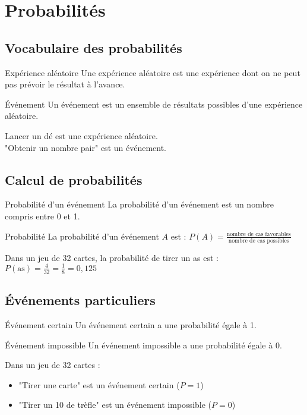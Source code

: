 \chapter{Probabilités}

\section{Vocabulaire des probabilités}
\begin{definition}{Expérience aléatoire}
Une expérience aléatoire est une expérience dont on ne peut pas prévoir le résultat à l'avance.
\end{definition}

\begin{definition}{Événement}
Un événement est un ensemble de résultats possibles d'une expérience aléatoire.
\end{definition}

\begin{exemple}
Lancer un dé est une expérience aléatoire.\\
"Obtenir un nombre pair" est un événement.
\end{exemple}

\section{Calcul de probabilités}
\begin{propriete}{Probabilité d'un événement}
La probabilité d'un événement est un nombre compris entre 0 et 1.
\end{propriete}

\begin{definition}{Probabilité}
La probabilité d'un événement $A$ est :
$P(A) = \frac{\text{nombre de cas favorables}}{\text{nombre de cas possibles}}$
\end{definition}

\begin{exemple}
Dans un jeu de 32 cartes, la probabilité de tirer un as est :
$P(\text{as}) = \frac{4}{32} = \frac{1}{8} = 0,125$
\end{exemple}

\section{Événements particuliers}
\begin{definition}{Événement certain}
Un événement certain a une probabilité égale à 1.
\end{definition}

\begin{definition}{Événement impossible}
Un événement impossible a une probabilité égale à 0.
\end{definition}

\begin{exemple}
Dans un jeu de 32 cartes :
\begin{itemize}
    \item "Tirer une carte" est un événement certain ($P = 1$)
    \item "Tirer un 10 de trèfle" est un événement impossible ($P = 0$)
\end{itemize}
\end{exemple} 
